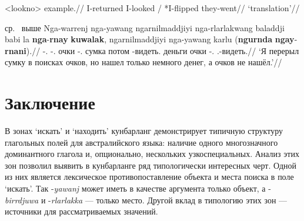 \ex<lookno>\begingl
\gla example.//
\glb I-returned {I-looked / *I-flipped} they-went//
\glft `translation'//
\endgl\xe


ср.\  выше
\begingl
\gla Nga-warrenj nga-yawang ngarnilmaddjiyi nga-rlarlakwang baladdji babi la \textbf{nga}-\textbf{rnay} \textbf{kuwalak}, ngarnilmaddjiyi nga-yawang karlu (\textbf{ngurnda} \textbf{ngay}-\textbf{rnani}).//
\glb \nga-\warre.\Pst{} \nga-\yaw.\Pst{} очки \nga-\rlk.\Pst{} сумка потом \la{} \nga-видеть.\Pst{} деньги очки \nga-\yaw.\Pst{} \karlu{} \phantom{(}\Neg{} \Fsg.\irrpst-видеть.\irrpst{}//
\glft `Я перерыл сумку в поисках очков, но нашел только немного денег, а очков не нашёл.'//%
\endgl\xe


\section{Заключение}
\label{sec:outro}

В зонах `искать' и `находить' кунбарланг демонстрирует типичную структуру глагольных полей для австралийского языка: наличие одного многозначного доминантного глагола и, опционально, нескольких узкоспециальных. Анализ этих зон позволил выявить в кунбарланге ряд типологически интересных черт. Одной из них является лексическое противопоставление объекта и места поиска в поле `искать'. Так -\textit{yawanj} может иметь в качестве аргумента только объект, а -\textit{birrdjuwa} и -\textit{rlarlakka} --- только место. Другой вклад в типологию этих зон --- источники для рассматриваемых значений. 




